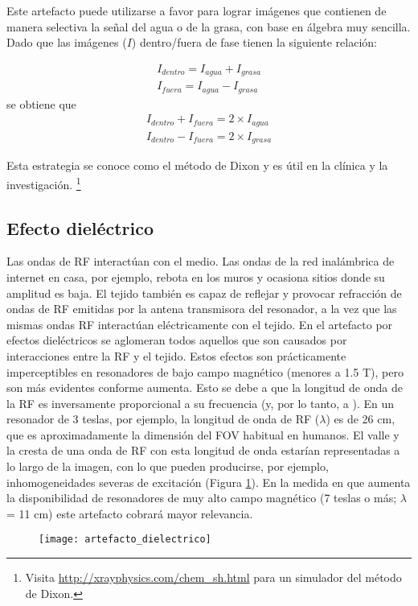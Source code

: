 Este artefacto puede utilizarse a favor para lograr imágenes que contienen de manera selectiva la señal del agua o de la grasa, con base en álgebra muy sencilla. Dado que las imágenes ($I$) dentro/fuera de fase tienen la siguiente relación:

\begin{equation*}
 \begin{aligned}
I_{dentro} = I_{agua} + I_{grasa} \\
I_{fuera} = I_{agua} - I_{grasa}
  \end{aligned}
\end{equation*}
se obtiene que
\begin{equation*}
 \begin{aligned}
I_{dentro} + I_{fuera} = 2 \times I_{agua} \\
I_{dentro} - I_{fuera} = 2 \times I_{grasa}
 \end{aligned}
\end{equation*}

Esta estrategia se conoce como el método de Dixon \cite{dixon1984} y es útil en la clínica y la investigación. \footnote{Visita \url{http://xrayphysics.com/chem_sh.html} para un simulador del método de Dixon.}



\subsection{Efecto dieléctrico}
Las ondas de RF interactúan con el medio. Las ondas de la red inalámbrica de internet en casa, por ejemplo, rebota en los muros y ocasiona sitios donde su amplitud es baja. El tejido también es capaz de reflejar y provocar refracción de ondas de RF emitidas por la antena transmisora del resonador, a la vez que las mismas ondas RF interactúan eléctricamente con el tejido. En el artefacto por efectos dieléctricos se aglomeran todos aquellos que son causados por interacciones entre la RF y el tejido. Estos efectos son prácticamente imperceptibles en resonadores de bajo campo magnético (menores a 1.5 T), pero son más evidentes conforme \Bzero aumenta. Esto se debe a que la longitud de onda de la RF es inversamente proporcional a su frecuencia (y, por lo tanto, a \Bzero). En un resonador de 3 teslas, por ejemplo, la longitud de onda de RF ($\lambda$) es de 26 cm, que es aproximadamente la dimensión del FOV habitual en humanos. El valle y la cresta de una onda de RF con esta longitud de onda estarían representadas a lo largo de la imagen, con lo que pueden producirse, por ejemplo, inhomogeneidades severas de excitación (Figura \ref{fig:artefacto_dielectrico}). En la medida en que aumenta la disponibilidad de resonadores de muy alto campo magnético (7 teslas o más; $\lambda$ = 11 cm) este artefacto cobrará mayor relevancia. 


\begin{figure}[htb]
 \begin{figg}
   \texttt{[image: artefacto\_dielectrico]}
   \caption{\figurapendiente}
 \label{fig:artefacto_dielectrico}
 \end{figg}
\end{figure}

